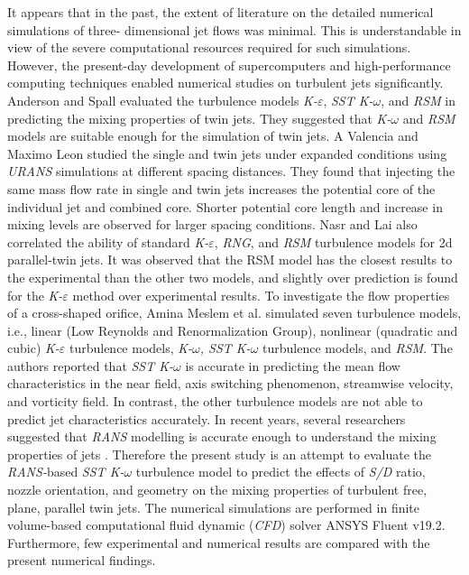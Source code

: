 \documentclass[Afour,sagev,times]{sagej}
\begin{document}
It appears that in the past, the extent of literature on the detailed numerical simulations of three- dimensional jet flows was minimal.\textbf{ }This is understandable in view of the severe computational resources required for such simulations. However, the present-day development of supercomputers and high-performance computing techniques enabled numerical studies on turbulent jets significantly. Anderson and Spall \cite{anderson2001experimental} evaluated the turbulence models \textit{K-$\varepsilon$}, \textit{SST K-$\omega$}, and \textit{RSM} in predicting the mixing properties of twin jets. They suggested that \textit{K-$\omega$} and \textit{RSM} models are suitable enough for the simulation of twin jets. A Valencia and Maximo Leon \cite{valencia2021analysis} studied the single and twin jets under expanded conditions using \textit{URANS }simulations at different spacing distances. They found that injecting the same mass flow rate in single and twin jets increases the potential core of the individual jet and combined core. Shorter potential core length and increase in mixing levels are observed for larger spacing conditions. Nasr and Lai \cite{nasr1997comparison} also correlated the ability of standard \textit{K-$\varepsilon$}, \textit{RNG}, and \textit{RSM} turbulence models for 2d parallel-twin jets. It was observed that the RSM model has the closest results to the experimental than the other two models, and slightly over prediction is found for the \textit{K-$\varepsilon$} method over experimental results. To investigate the flow properties of a cross-shaped orifice, Amina Meslem et al. \cite{meslem2014comparison} simulated seven turbulence models, i.e., linear (Low Reynolds and Renormalization Group), nonlinear (quadratic and cubic) \textit{K-$\varepsilon$} turbulence models, \textit{K-$\omega$, SST K-$\omega$} turbulence models, and \textit{RSM}.  The authors reported that \textit{SST K-$\omega$} is accurate in predicting the mean flow characteristics in the near field, axis switching phenomenon, streamwise velocity, and vorticity field. In contrast, the other turbulence models are not able to predict jet characteristics accurately. In recent years, several researchers suggested that \textit{RANS} modelling is accurate enough to understand the mixing properties of jets \cite{lin1990investigation,anderson2001experimental}. Therefore the present study is an attempt to evaluate the \textit{RANS-}based \textit{SST K-$\omega$} turbulence model to predict the effects of \textit{S/D} ratio, nozzle orientation, and geometry on the mixing properties of turbulent free, plane, parallel twin jets. The numerical simulations are performed in finite volume-based computational fluid dynamic (\textit{CFD}) solver ANSYS Fluent v19.2. Furthermore, few experimental and numerical results are compared with the present numerical findings. 
\end{document}
